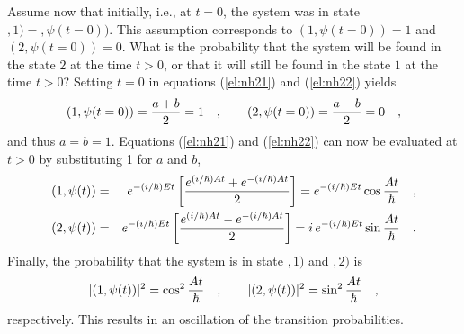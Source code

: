 Assume now that initially, i.e., at $t=0$, the system was in state
$, 1) =, \psi (t=0))$. This assumption corresponds to
$
( 1 , \psi (t=0)  ) =1
$
and
$
( 2 , \psi (t=0)  ) =0
$.
What is the probability that the system will be found
in the state
$
2
$
at the time $t>0$, or that
it will still be found
in the state
$
 1
$
at the time $t>0$?
Setting $t=0$ in equations
(\ref{el:nh21}) and (\ref{el:nh22}) yields
\begin{equation}
( 1 , \psi  (t=0))   = {a+b\over 2}=1
\quad ,\qquad
( 2 , \psi  (t=0))   = {a-b\over 2}=0
\quad ,
\end{equation}
and thus $a=b=1$. Equations
(\ref{el:nh21}) and (\ref{el:nh22}) can now be evaluated at $t>0$ by
substituting
1 for
$a$ and
$b$,
\begin{eqnarray}
( 1 , \psi  (t))
&=&
e^{-(i/\hbar )Et}\left[
{
e^{(i/\hbar )At}+
e^{-(i/\hbar )At}
\over 2}
\right]
=
e^{-(i/\hbar )Et}\cos {At\over \hbar }
\label{el:nh23}
\quad ,\\
( 2 , \psi  (t))
&=&
e^{-(i/\hbar )Et}\left[
{
e^{(i/\hbar )At}-
e^{-(i/\hbar )At}
\over 2}
\right]
=
i\,e^{-(i/\hbar )Et}\sin {At\over \hbar }
\label{el:nh24}
\quad .
\end{eqnarray}
Finally, the probability that the system is in state
$, 1)$ and
$, 2)$
is
\begin{equation}
\vert ( 1 , \psi  (t)) \vert^2  = \cos^2{At\over \hbar}
\quad ,\qquad
\vert ( 2 , \psi  (t)) \vert^2  = \sin^2{At\over \hbar}
\quad ,
\label{eqn:p}
\end{equation}
respectively. This results in an oscillation of the transition
probabilities.

